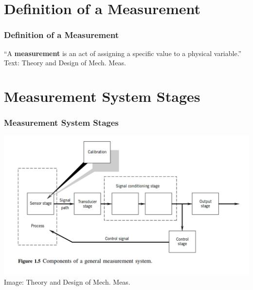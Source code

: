 \documentclass[fleqn]{beamer} %
\newcommand{\sectiontitleII}{Definition of a Measurement}
\newcommand{\sectiontitleIII}{Measurement System Stages}
\begin{document}
\section{\sectiontitleII}

\begin{frame}[label=sectionII]
\frametitle{\sectiontitleII}

\large{``A {\bf \BL measurement} is an act of assigning a specific value to a physical variable.''} \vspc
{\tiny Text: Theory and Design of Mech. Meas.}

\end{frame}

\section{\sectiontitleIII}

\begin{frame}[label=sectionIII]
\frametitle{\sectiontitleIII}

\includegraphics[scale=.3]{measurement_stages} \\
{\tiny Image: Theory and Design of Mech. Meas.}
\end{frame}
\end{document}
